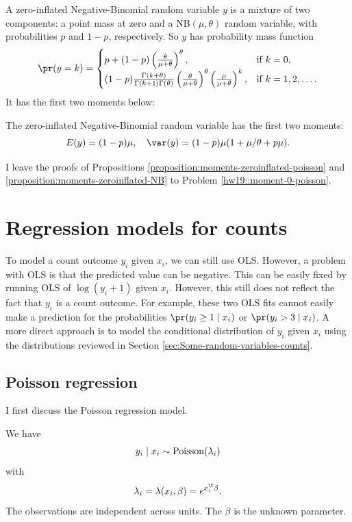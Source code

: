 A zero-inflated Negative-Binomial random variable $y$ is a mixture
of two components: a point mass at zero and a NB$(\mu,\theta)$ random
variable, with probabilities $p$ and $1-p$, respectively. So $y$
has probability mass function
\[
\pr(y=k)=\begin{cases}
p+(1-p)\left(\frac{\theta}{\mu+\theta}\right)^{\theta}, & \text{if }k=0,\\
(1-p)\frac{\Gamma(k+\theta)}{\Gamma(k+1)\Gamma(\theta)}\left(\frac{\theta}{\mu+\theta}\right)^{\theta}\left(\frac{\mu}{\mu+\theta}\right)^{k}, & \text{if }k=1,2,\ldots.
\end{cases}
\]
It has the first two moments below:
\begin{proposition}
\label{proposition:moments-zeroinflated-NB}
The zero-inflated Negative-Binomial random variable has the first two moments:
$$
E(y)=(1-p)\mu,\quad \var(y)=(1-p) \mu (1+\mu/\theta+p\mu).
$$
\end{proposition}


I leave the proofs of Propositions \ref{proposition:moments-zeroinflated-poisson} and \ref{proposition:moments-zeroinflated-NB} to Problem \ref{hw19::moment-0-poisson}. 



\section{Regression models for counts}

To model a count outcome $y_{i}$ given $x_{i}$, we can still use
OLS. However, a problem with OLS is that the predicted value can be negative.
This can be easily fixed by running OLS of $\log(y_{i}+1)$ given
$x_{i}$. However, this still does not reflect the fact that $y_{i}$
is a count outcome. For example, these two OLS fits cannot easily make
a prediction for the probabilities $\pr(y_{i}\geq1\mid x_{i})$ or
$\pr(y_{i}>3\mid x_{i})$. A more direct approach is to model the
conditional distribution of $y_{i}$ given $ x_{i}$ using the distributions
reviewed in Section \ref{sec:Some-random-variables-counts}.

\subsection{Poisson regression}

I first discuss the Poisson regression model.

\begin{assumption}
\label{assume::poisson-regression}
We have 
$$
y_{i}  \mid  x_{i}  \sim\textup{Poisson}(\lambda_{i})
$$
with 
$$
\lambda_{i}  = \lambda(x_{i},\beta)=e^{x_{i}^{\T}\beta}.
$$
The observations are independent across units. The $\beta$ is the unknown parameter. 
\end{assumption}

